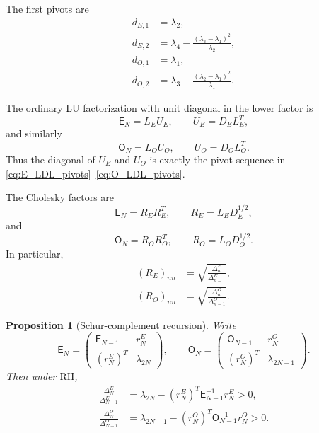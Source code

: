 \documentclass[preprint,12pt]{elsarticle}
\numberwithin{equation}{section}
\theoremstyle{plain}
\newtheorem{proposition}[theorem]{Proposition}
\theoremstyle{definition}
\theoremstyle{remark}
\newcommand{\RH}{\mathrm{RH}}
\newcommand{\E}{\mathsf E}
\newcommand{\Omat}{\mathsf O}
\begin{document}
The first pivots are
\begin{align}
d_{E,1}&=\lambda_2,
\label{eq:E_first_pivot}\\
d_{E,2}&=\lambda_4-
\frac{(\lambda_3-\lambda_1)^2}{\lambda_2},
\label{eq:E_second_pivot}\\
d_{O,1}&=\lambda_1,
\label{eq:O_first_pivot}\\
d_{O,2}&=\lambda_3-
\frac{(\lambda_2-\lambda_1)^2}{\lambda_1}.
\label{eq:O_second_pivot}
\end{align}

The ordinary LU factorization with unit diagonal in the lower factor is
\begin{equation}
\E_N=L_EU_E,
\qquad U_E=D_EL_E^T,
\label{eq:E_LU}
\end{equation}
and similarly
\begin{equation}
\Omat_N=L_OU_O,
\qquad U_O=D_OL_O^T.
\label{eq:O_LU}
\end{equation}
Thus the diagonal of $U_E$ and $U_O$ is exactly the pivot sequence in \eqref{eq:E_LDL_pivots}--\eqref{eq:O_LDL_pivots}.

The Cholesky factors are
\begin{equation}
\E_N=R_ER_E^T,
\qquad R_E=L_ED_E^{1/2},
\label{eq:E_cholesky}
\end{equation}
and
\begin{equation}
\Omat_N=R_OR_O^T,
\qquad R_O=L_OD_O^{1/2}.
\label{eq:O_cholesky}
\end{equation}
In particular,
\begin{align}
(R_E)_{nn}&=\sqrt{\frac{\Delta_n^E}{\Delta_{n-1}^E}},
\label{eq:E_cholesky_diagonal}\\
(R_O)_{nn}&=\sqrt{\frac{\Delta_n^O}{\Delta_{n-1}^O}}.
\label{eq:O_cholesky_diagonal}
\end{align}

\begin{proposition}[Schur-complement recursion]
\label{prop:schur_recursion}
Write
\begin{equation}
\E_N=
\begin{pmatrix}
\E_{N-1}&r_N^E\\
(r_N^E)^T&\lambda_{2N}
\end{pmatrix},
\qquad
\Omat_N=
\begin{pmatrix}
\Omat_{N-1}&r_N^O\\
(r_N^O)^T&\lambda_{2N-1}
\end{pmatrix}.
\label{eq:block_decomposition}
\end{equation}
Then under $\RH$,
\begin{align}
\frac{\Delta_N^E}{\Delta_{N-1}^E}
&=\lambda_{2N}-(r_N^E)^T\E_{N-1}^{-1}r_N^E>0,
\label{eq:E_schur_complement}\\
\frac{\Delta_N^O}{\Delta_{N-1}^O}
&=\lambda_{2N-1}-(r_N^O)^T\Omat_{N-1}^{-1}r_N^O>0.
\label{eq:O_schur_complement}
\end{align}
\end{proposition}
\end{document}
